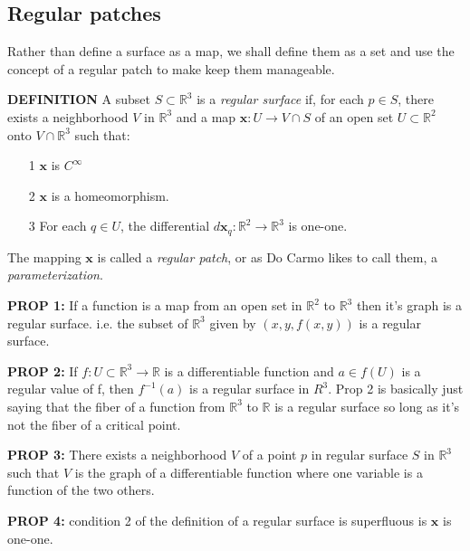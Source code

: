 \documentclass{article}
\begin{document}
\subsection{Regular patches}
Rather than define a surface as a map, we shall define them as a set and use the concept of a regular patch to make keep them manageable. \vspace{5mm}

\textbf{DEFINITION} A subset $S \subset \mathbb{R}^3$ is a \textit{regular surface} if, for each $p \in S$, there exists a neighborhood $V$ in $\mathbb{R}^3$ and a map $\mathbf{x}:U \to V \cap S$ of an open set $U \subset \mathbb{R}^2$ onto $V \cap \mathbb{R}^3$ such that:
\begin{enumerate}
    \item[1] $\mathbf{x}$ is $C^{\infty}$
    \item[2] $\mathbf{x}$ is a homeomorphism. 
    \item[3] For each $q \in U$, the differential $d\mathbf{x}_q: \mathbb{R}^2 \to \mathbb{R}^3$ is one-one.
\end{enumerate}
The mapping $\mathbf{x}$ is called a \textit{regular patch}, or as Do Carmo likes to call them, a \textit{parameterization}. \vspace{5mm}

\textbf{PROP 1:} If a function is a map from an open set in $\mathbb{R}^2$ to $\mathbb{R}^3$ then it's graph is a regular surface. i.e. the subset of $\mathbb{R}^3$ given by $(x, y, f(x, y))$ is a regular surface. \vspace{5mm}

\textbf{PROP 2:} If $f: U \subset \mathbb{R}^3 \to \mathbb{R}$ is a differentiable function and $a \in f(U)$ is a regular value of f, then $f^{-1}(a)$ is a regular surface in $R^3$. \vspace{5mm}
Prop 2 is basically just saying that the fiber of a function from $\mathbb{R}^3$ to $\mathbb{R}$ is a regular surface so long as it's not the fiber of a critical point. \vspace{5mm}

\textbf{PROP 3:} There exists a neighborhood $V$ of a point $p$ in regular surface $S$ in $\mathbb{R}^3$ such that $V$ is the graph of a differentiable function where one variable is a function of the two others. \vspace{5mm}

\textbf{PROP 4:} condition 2 of the definition of a regular surface is superfluous is $\mathbf{x}$ is one-one.
\end{document}
